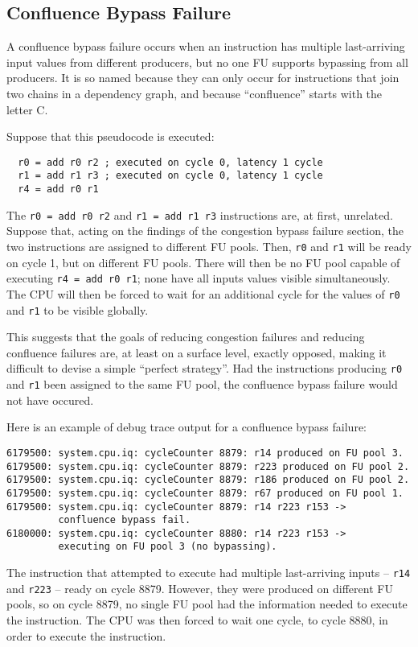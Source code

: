 \documentclass[11pt]{article}
\begin{document}
\subsection{Confluence Bypass Failure}

A confluence bypass failure occurs when an instruction has multiple
last-arriving input values from different producers, but no one FU
supports bypassing from all producers. It is so named because they
can only occur for instructions that join two chains in a dependency
graph, and because ``confluence'' starts with the letter C.

Suppose that this pseudocode is executed:
\begin{verbatim}
  r0 = add r0 r2 ; executed on cycle 0, latency 1 cycle
  r1 = add r1 r3 ; executed on cycle 0, latency 1 cycle
  r4 = add r0 r1
\end{verbatim}
The \texttt{r0 = add r0 r2} and \texttt{r1 = add r1 r3} instructions
are, at first, unrelated. Suppose that, acting on the findings of the
congestion bypass failure section, the two instructions are assigned
to different FU pools. Then, \texttt{r0} and \texttt{r1} will be ready
on cycle 1, but on different FU pools. There will then be no FU pool
capable of executing \texttt{r4 = add r0 r1}; none have all inputs
values visible simultaneously. The CPU will then be forced to wait
for an additional cycle for the values of \texttt{r0} and \texttt{r1}
to be visible globally.

This suggests that the goals of reducing congestion failures and
reducing confluence failures are, at least on a surface level, exactly
opposed, making it difficult to devise a simple ``perfect
strategy''. Had the instructions producing \texttt{r0} and \texttt{r1}
been assigned to the same FU pool, the confluence bypass failure would
not have occured.

Here is an example of debug trace output for a confluence bypass
failure:
\begin{verbatim}
6179500: system.cpu.iq: cycleCounter 8879: r14 produced on FU pool 3.
6179500: system.cpu.iq: cycleCounter 8879: r223 produced on FU pool 2.
6179500: system.cpu.iq: cycleCounter 8879: r186 produced on FU pool 2.
6179500: system.cpu.iq: cycleCounter 8879: r67 produced on FU pool 1.
6179500: system.cpu.iq: cycleCounter 8879: r14 r223 r153 ->
         confluence bypass fail.
6180000: system.cpu.iq: cycleCounter 8880: r14 r223 r153 ->
         executing on FU pool 3 (no bypassing).
\end{verbatim}
The instruction that attempted to execute had multiple last-arriving
inputs -- \texttt{r14} and \texttt{r223} -- ready on cycle
8879. However, they were produced on different FU pools, so on cycle
8879, no single FU pool had the information needed to execute the
instruction.  The CPU was then forced to wait one cycle, to cycle
8880, in order to execute the instruction.
\end{document}
